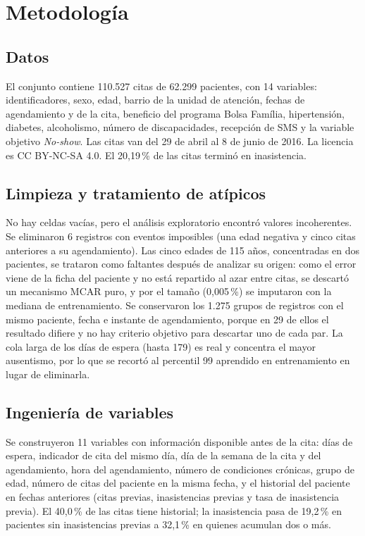 \documentclass[11pt,letterpaper]{article}
\begin{document}
\section{Metodología}

\subsection{Datos}
El conjunto contiene 110.527 citas de 62.299 pacientes, con 14 variables: identificadores, sexo, edad, barrio de la unidad de atención, fechas de agendamiento y de la cita, beneficio del programa Bolsa Família, hipertensión, diabetes, alcoholismo, número de discapacidades, recepción de SMS y la variable objetivo \emph{No-show}. Las citas van del 29 de abril al 8 de junio de 2016. La licencia es CC BY-NC-SA 4.0. El 20,19\,\% de las citas terminó en inasistencia.

\subsection{Limpieza y tratamiento de atípicos}
No hay celdas vacías, pero el análisis exploratorio encontró valores incoherentes. Se eliminaron 6 registros con eventos imposibles (una edad negativa y cinco citas anteriores a su agendamiento). Las cinco edades de 115 años, concentradas en dos pacientes, se trataron como faltantes después de analizar su origen: como el error viene de la ficha del paciente y no está repartido al azar entre citas, se descartó un mecanismo MCAR puro, y por el tamaño (0,005\,\%) se imputaron con la mediana de entrenamiento. Se conservaron los 1.275 grupos de registros con el mismo paciente, fecha e instante de agendamiento, porque en 29 de ellos el resultado difiere y no hay criterio objetivo para descartar uno de cada par. La cola larga de los días de espera (hasta 179) es real y concentra el mayor ausentismo, por lo que se recortó al percentil 99 aprendido en entrenamiento en lugar de eliminarla.

\subsection{Ingeniería de variables}
Se construyeron 11 variables con información disponible antes de la cita: días de espera, indicador de cita del mismo día, día de la semana de la cita y del agendamiento, hora del agendamiento, número de condiciones crónicas, grupo de edad, número de citas del paciente en la misma fecha, y el historial del paciente en fechas anteriores (citas previas, inasistencias previas y tasa de inasistencia previa). El 40,0\,\% de las citas tiene historial; la inasistencia pasa de 19,2\,\% en pacientes sin inasistencias previas a 32,1\,\% en quienes acumulan dos o más.
\end{document}
